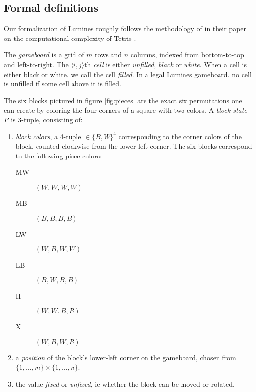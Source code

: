 \subsection{Formal definitions}
Our formalization of Lumines roughly follows the methodology of \citeauthor{tetris} in their paper on the computational complexity of Tetris \cite{tetris}.

\begin{description}[style=unboxed, leftmargin=0cm,labelsep=1em]
    \item[The gameboard] The \emph{gameboard} is a grid of $m$ rows and $n$ columns, indexed from bottom-to-top and left-to-right. The $\langle i,j \rangle$th \emph{cell} is either \emph{unfilled}, \emph{black} or \emph{white}. When a cell is either black or white, we call the cell \emph{filled}. In a legal Lumines gameboard, no cell is unfilled if some cell above it is filled.

    \item[Game blocks] The six blocks pictured in \hyperref[fig:pieces]{figure \ref*{fig:pieces}} are the exact six permutations one can create by coloring the four corners of a square with two colors. A \emph{block state P} is 3-tuple, consisting of: 
    \begin{enumerate}
        \item \emph{block colors}, a 4-tuple $\in \{B,W\}^4$ corresponding to the corner colors of the block, counted clockwise from the lower-left corner. The six blocks correspond to the following piece colors:

        \begin{description}
            \item[MW] $(W,W,W,W)$
            \item[MB] $(B,B,B,B)$
            \item[LW] $(W,B,W,W)$
            \item[LB] $(B,W,B,B)$
            \item[H] $(W,W,B,B)$
            \item[X] $(W,B,W,B)$
        \end{description}

        \item a \emph{position} of the block's lower-left corner on the gameboard, chosen from $\{1, \ldots, m\} \times \{1, \ldots, n\}$.
        \item the value \emph{fixed} or \emph{unfixed}, ie whether the block can be moved or rotated.
    \end{enumerate}


\end{description}
